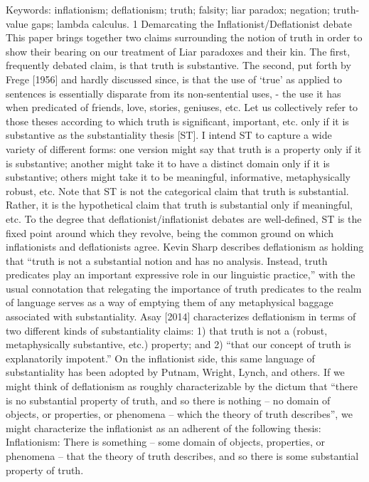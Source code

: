 \documentclass[]{article}
\begin{document}
Keywords: inflationism; deflationism; truth; falsity; liar paradox; negation; truth-value gaps; lambda calculus.
1 Demarcating the Inflationist/Deflationist debate 
This paper brings together two claims surrounding the notion of truth in order to show their bearing on our treatment of Liar paradoxes and their kin. The first, frequently debated claim, is that truth is substantive. The second, put forth by Frege [1956] and hardly discussed since, is that the use of ‘true’ as applied to sentences is essentially disparate from its non-sentential uses, - the use it has when predicated of friends, love, stories, geniuses, etc.
Let us collectively refer to those theses according to which truth is significant, important, etc. only if it is substantive as the substantiality thesis [ST]. I intend ST to capture a wide variety of different forms: one version might say that truth is a property only if it is substantive; another might take it to have a distinct domain only if it is substantive; others might take it to be meaningful, informative, metaphysically robust, etc. Note that ST is not the categorical claim that truth is substantial. Rather, it is the hypothetical claim that truth is substantial only if meaningful, etc.
To the degree that deflationist/inflationist debates are well-defined,   ST is the fixed point around which they revolve, being the common ground on which inflationists and deflationists agree. Kevin Sharp describes deflationism as holding that “truth is not a substantial notion and has no analysis. Instead, truth predicates play an important expressive role in our linguistic practice,”  with the usual connotation that relegating the importance of truth predicates to the realm of language serves as a way of emptying them of any metaphysical baggage associated with substantiality. Asay [2014] characterizes deflationism in terms of two different kinds of substantiality claims: 1) that truth is not a (robust, metaphysically substantive, etc.) property; and 2) “that our concept of truth is explanatorily impotent.”  On the inflationist side, this same language of substantiality has been adopted by Putnam, Wright, Lynch, and others. 
If  we might think of deflationism as roughly characterizable by the dictum that “there is no substantial property of truth, and so there is nothing – no domain of objects, or properties, or phenomena – which the theory of truth describes”,  we might characterize the inflationist as an adherent of the following thesis:
Inflationism: There is something – some domain of objects, properties, or phenomena – that the theory of truth describes, and so there is some substantial property of truth.
\end{document}
